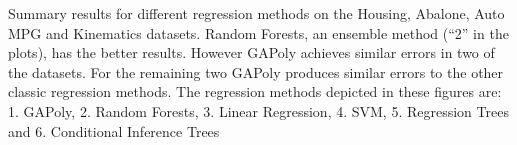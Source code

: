 Summary results for different regression methods on the Housing, Abalone, Auto MPG and Kinematics datasets. Random Forests, an ensemble method (``2'' in the plots), has the better results. However \ac{GAPoly} achieves similar errors in two of the datasets. For the remaining two \ac{GAPoly} produces similar errors to the other classic regression methods.  The regression methods depicted in these figures are: 1. \ac{GAPoly}, 2. Random Forests, 3. Linear Regression, 4. SVM, 5. Regression Trees and 6. Conditional Inference Trees